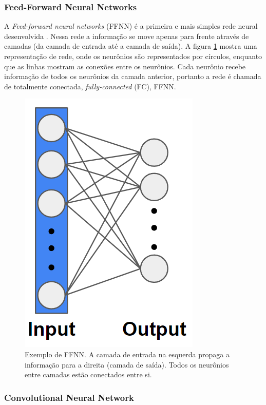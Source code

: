\documentclass[a4paper,12pt,oneside]{book}
\begin{document}
\subsubsection*{Feed-Forward Neural Networks}

\par A \textit{Feed-forward neural networks} (FFNN) é a primeira e mais simples rede neural desenvolvida \cite{talent_ml, bishop2016pattern}. Nessa rede a informação se move apenas para frente através de camadas (da camada de entrada até a camada de saída). A figura \ref{fig:FFNN} mostra uma representação de rede, onde os neurônios são representados por círculos, enquanto que as linhas mostram as conexões entre os neurônios. Cada neurônio recebe informação de todos os neurônios da camada anterior, portanto a rede é chamada de totalmente conectada, \textit{fully-connected} (FC), FFNN. 

\begin{figure}[H]
    \centering
    \includegraphics[scale = 0.55]{figs/FFNN.png}
    \caption{Exemplo de FFNN. A camada de entrada na esquerda propaga a informação para a direita (camada de saída). Todos os neurônios entre camadas estão conectados entre si.}
    \label{fig:FFNN}
\end{figure}

\subsubsection*{Convolutional Neural Network}
\end{document}

